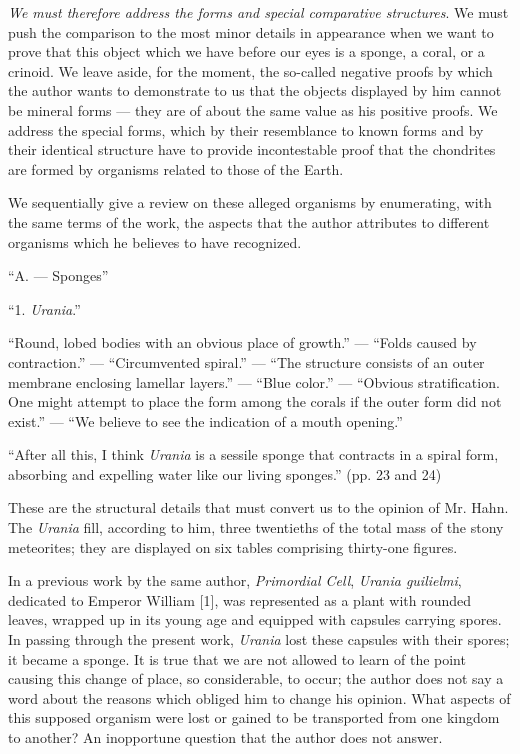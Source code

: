 \documentclass[a4paper, 12pt, oneside]{article}
\begin{document}
\emph{We must therefore address the forms and special comparative structures}. We must push the comparison to the most minor details in appearance when we want to prove that this object which we have before our eyes is a sponge, a coral, or a crinoid. We leave aside, for the moment, the so-called negative proofs by which the author wants to demonstrate to us that the objects displayed by him cannot be mineral forms --- they are of about the same value as his positive proofs. We address the special forms, which by their resemblance to known forms and by their identical structure have to provide incontestable proof that the chondrites are formed by organisms related to those of the Earth.

We sequentially give a review on these alleged organisms by enumerating, with the same terms of the work, the aspects that the author attributes to different organisms which he believes to have recognized.

``A. --- Sponges''

``1. \emph{Urania}.''

``Round, lobed bodies with an obvious place of growth.'' --- ``Folds caused by contraction.'' --- ``Circumvented spiral.'' --- ``The structure consists of an outer membrane enclosing lamellar layers.'' --- ``Blue color.'' --- ``Obvious stratification. One might attempt to place the form among the corals if the outer form did not exist.'' --- ``We believe to see the indication of a mouth opening.''

``After all this, I think \emph{Urania} is a sessile sponge that contracts in a spiral form, absorbing and expelling water like our living sponges.'' (pp. 23 and 24)

These are the structural details that must convert us to the opinion of Mr. Hahn. The \emph{Urania} fill, according to him, three twentieths of the total mass of the stony meteorites; they are displayed on six tables comprising thirty-one figures.

In a previous work by the same author, \emph{Primordial Cell}, \emph{Urania guilielmi}, dedicated to Emperor William [1], was represented as a plant with rounded leaves, wrapped up in its young age and equipped with capsules carrying spores. In passing through the present work, \emph{Urania} lost these capsules with their spores; it became a sponge. It is true that we are not allowed to learn of the point causing this change of place, so considerable, to occur; the author does not say a word about the reasons which obliged him to change his opinion. What aspects of this supposed organism were lost or gained to be transported from one kingdom to another? An inopportune question that the author does not answer.
\end{document}
